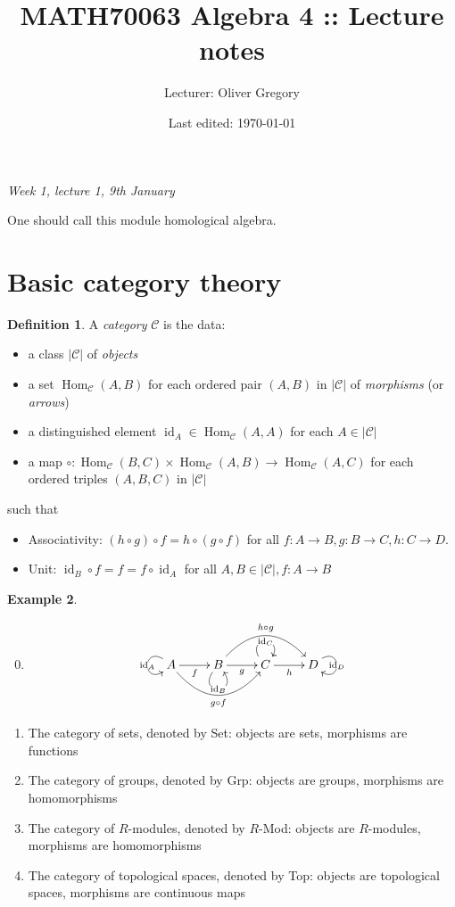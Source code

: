 \documentclass{article}
\title{MATH70063 Algebra 4 :: Lecture notes}
\author{Lecturer: Oliver Gregory}
\date{Last edited: \today}
\newcommand{\id}{\operatorname{id}}
\newcommand{\Hom}{\operatorname{Hom}}
\newcommand{\ca}{\mathcal{C}}
\theoremstyle{definition}
\newtheorem{defn}{Definition}[subsection]
\newtheorem{example}[defn]{Example}
\begin{document}
\maketitle
\thispagestyle{empty}

\tableofcontents
\thispagestyle{empty}
\newpage
\setcounter{page}{1}

\begin{flushright}
\textit{Week 1, lecture 1, 9th January}
\end{flushright}

One should call this module homological algebra.

\section{Basic category theory}
\begin{defn}
A \textit{category} $\ca$ is the data:
\begin{itemize}
\item a class $|\ca|$ of \textit{objects}
\item a set $\Hom_\ca(A,B)$ for each ordered pair $(A,B)$ in $|\ca|$ of \textit{morphisms} (or \textit{arrows})
\item a distinguished element $\id_A\in\Hom_\ca(A,A)$ for each $A\in|\ca|$
\item a map $\circ:\Hom_\ca(B,C)\times\Hom_\ca(A,B)\rightarrow\Hom_\ca(A,C)$ for each ordered triples $(A,B,C)$ in $|\ca|$
\end{itemize}
such that
\begin{itemize}
\item Associativity: $(h\circ g)\circ f=h\circ (g\circ f)$ for all $f:A\rightarrow B,g:B\rightarrow C,h:C\rightarrow D$.
\item Unit: $\id_B\circ f=f=f\circ\id_A$ for all $A,B\in|\ca|,f:A\rightarrow B$
\end{itemize}
\end{defn}

\begin{example}
\begin{enumerate}
\setcounter{enumi}{-1}
\item \[
\xymatrix{
A\ar[r]_f \ar@/_2pc/[rr]_{g\circ f}\ar@(lu,ld)[]|{\id_A} & B\ar[r]_g\ar@/^2pc/[rr]^{h\circ g}\ar@(dl,dr)[]|{\id_B} & C\ar[r]_h\ar@(ul,ur)[]|{\id_C} & D\ar@(ru,rd)[]|{\id_D}
}
\]
\item The category of sets, denoted by Set: objects are sets, morphisms are functions
\item The category of groups, denoted by Grp: objects are groups, morphisms are homomorphisms
\item The category of $R$-modules, denoted by $R$-Mod: objects are $R$-modules, morphisms are homomorphisms
\item The category of topological spaces, denoted by Top: objects are topological spaces, morphisms are continuous maps
\end{enumerate}
\end{example}
\end{document}
